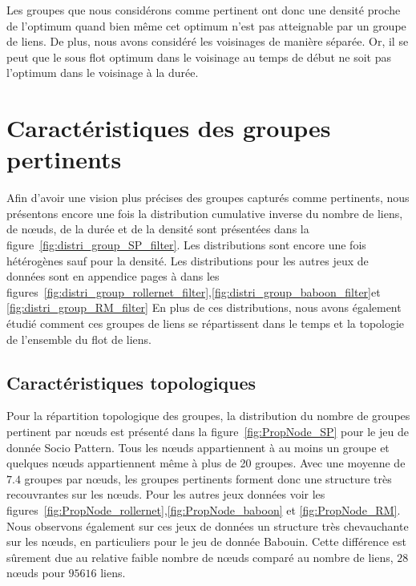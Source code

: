Les groupes que nous considérons comme pertinent ont donc une densité proche de l'optimum quand bien même cet optimum n'est pas atteignable par un groupe de liens.
De plus, nous avons considéré les voisinages de manière séparée.
Or, il se peut que le sous flot optimum dans le voisinage au temps de début ne soit pas l'optimum dans le voisinage à la durée.


\section{Caractéristiques des groupes pertinents}

Afin d'avoir une vision plus précises des groupes capturés comme pertinents, nous présentons encore une fois la distribution cumulative inverse du nombre de liens, de n\oe uds, de la durée et de la densité sont présentées dans la figure~\ref{fig:distri_group_SP_filter}.
Les distributions sont encore une fois hétérogènes sauf pour la densité.
Les distributions pour les autres jeux de données sont en appendice pages \pageref{fig:distri_group_rollernet_filter} à \pageref{fig:distri_group_RM_filter} dans les figures~\ref{fig:distri_group_rollernet_filter},\ref{fig:distri_group_baboon_filter}et \ref{fig:distri_group_RM_filter}
En plus de ces distributions, nous avons également étudié comment ces groupes de liens se répartissent dans le temps et la topologie de l'ensemble du flot de liens.

\subsection{Caractéristiques topologiques}
Pour la répartition topologique des groupes, la distribution du nombre de groupes pertinent par n\oe uds est présenté dans la figure~\ref{fig:PropNode_SP} pour le jeu de donnée Socio Pattern.
Tous les n\oe uds appartiennent à au moins un groupe et quelques n\oe uds appartiennent même à plus de 20 groupes.
Avec une moyenne de $7.4$ groupes par n\oe uds, les groupes pertinents forment donc une structure très recouvrantes sur les n\oe uds.
Pour les autres jeux données voir les figures~\ref{fig:PropNode_rollernet},\ref{fig:PropNode_baboon} et \ref{fig:PropNode_RM}.
Nous observons également sur ces jeux de données un structure très chevauchante sur les n\oe uds, en particuliers pour le jeu de donnée Babouin.
Cette différence est sûrement due au relative faible nombre de n\oe uds comparé au nombre de liens, $28$ n\oe uds pour $95616$ liens.

